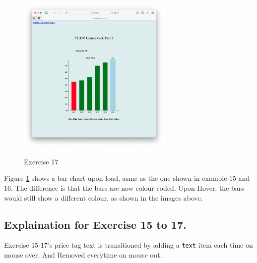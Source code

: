 \documentclass{scrreprt}
\begin{document}
\begin{figure}[!ht]
    \includegraphics[width = 7.5cm]{images/ex17_4.png}
    \label{fig:ex17}
    \caption{Exercise 17}
\end{figure}
\FloatBarrier

Figure \ref{fig:ex17} shows a bar chart upon load, asme as the one shown in example 15 and 16. The difference is that the bars are now colour coded. Upon Hover, the bars would still show a different colour, as shown in the images above.  

\subsection{Explaination for Exercise 15 to 17.}
Exercise 15-17's price tag text is transitioned by adding a \verb|text| item each time on mouse over. And Removed everytime on mouse out.
\end{document}
